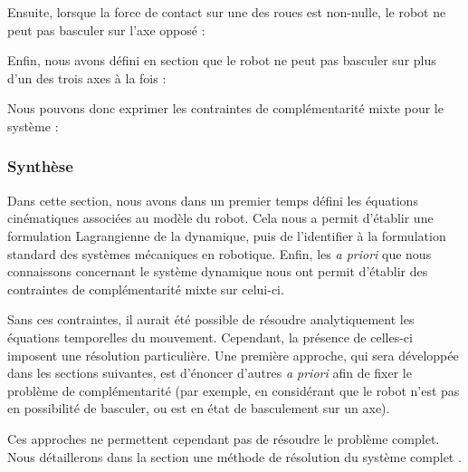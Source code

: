 				Ensuite, lorsque la force de contact sur une des roues est non-nulle, le robot ne peut pas basculer sur l'axe opposé :
				
				Enfin, nous avons défini en section  que le robot ne peut pas basculer sur plus d'un des trois axes à la fois :
				
				Nous pouvons donc exprimer les contraintes de complémentarité mixte pour le système :
				
			\subsubsection{Synthèse}
			
				Dans cette section, nous avons dans un premier temps défini les équations cinématiques associées au modèle du robot.
				Cela nous a permit d'établir une formulation Lagrangienne de la dynamique, puis de l'identifier à la formulation standard des systèmes mécaniques en robotique.
				Enfin, les \textit{a priori} que nous connaissons concernant le système dynamique nous ont permit d'établir des contraintes de complémentarité mixte sur celui-ci.
				
				
				
				Sans ces contraintes, il aurait été possible de résoudre analytiquement les équations temporelles du mouvement. Cependant, la présence de celles-ci imposent une résolution particulière.
				Une première approche, qui sera développée dans les sections suivantes, est d'énoncer d'autres \textit{a priori} afin de fixer le problème de complémentarité
				(par exemple, en considérant que le robot n'est pas en possibilité de basculer, ou est en état de basculement sur un axe). 
				
				Ces approches ne permettent cependant pas de résoudre le problème complet. 
				Nous détaillerons dans la section  une méthode de résolution du système complet .
		
